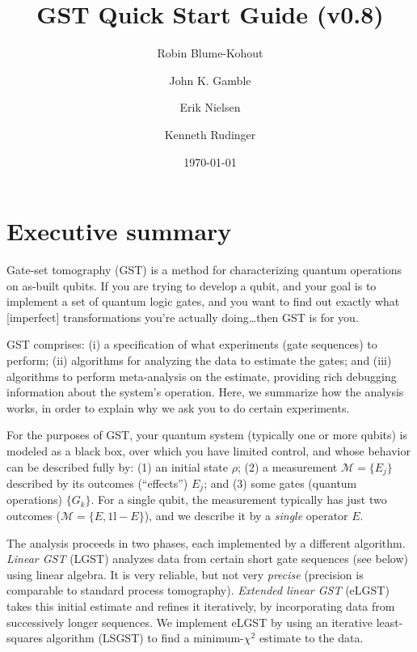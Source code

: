 \documentclass{article}[11pt]
\title{GST Quick Start Guide (v0.8)}
\date{\today}
\author[1]{Robin Blume-Kohout}
\author[1]{John K. Gamble}
\author[1]{Erik Nielsen}
\author[1]{Kenneth Rudinger}
\affil[1]{Sandia National Laboratories}
\def\Id{1\!\mathrm{l}}
\newcommand{\cM}{\mathcal{M}}
\begin{document}
\maketitle
\tableofcontents

\newpage
\section{Executive summary}

Gate-set tomography (GST) is a method for characterizing quantum operations on as-built qubits.  If you are trying to develop a qubit, and your goal is to implement a set of quantum logic gates, and you want to find out exactly what [imperfect] transformations you're actually doing\ldots then GST is for you.


GST comprises: (i) a specification of what experiments (gate sequences) to perform; (ii) algorithms for analyzing the data to estimate the gates; and (iii) algorithms to perform meta-analysis on the estimate, providing rich debugging information about the system's operation.  Here, we summarize how the analysis works, in order to explain why we ask you to do certain experiments.

For the purposes of GST, your quantum system (typically one or more qubits) is modeled as a black box, over which you have limited control, and whose behavior can be described fully by: (1) an initial state $\rho$; (2) a measurement $\mathcal{M} = \{E_j\}$ described by its outcomes (``effects'') $E_j$; and (3) some gates (quantum operations) $\{G_k\}$.  For a single qubit, the measurement typically has just two outcomes ($\cM = \{E,\Id-E\}$), and we describe it by a \emph{single} operator $E$.

The analysis proceeds in two phases, each implemented by a different algorithm.  \emph{Linear GST} (LGST) analyzes data from certain short gate sequences (see below) using linear algebra. It is very reliable, but not very \emph{precise} (precision is comparable to standard process tomography).  \emph{Extended linear GST} (eLGST) takes this initial estimate and refines it iteratively, by incorporating data from successively longer sequences.  We implement eLGST by using an iterative least-squares algorithm (LSGST) to find a minimum-$\chi^2$ estimate to the data.
\end{document}
